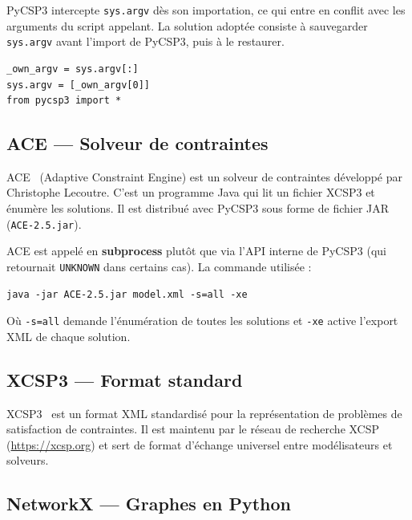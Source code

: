 \begin{attention}
  PyCSP3 intercepte \texttt{sys.argv} dès son importation, ce qui entre en conflit avec les
  arguments du script appelant. La solution adoptée consiste à sauvegarder \texttt{sys.argv}
  avant l'import de PyCSP3, puis à le restaurer.
  \begin{lstlisting}
_own_argv = sys.argv[:]
sys.argv = [_own_argv[0]]
from pycsp3 import *
  \end{lstlisting}
\end{attention}

\subsection{ACE — Solveur de contraintes}

\begin{definition}[ACE]
  ACE~\cite{ace} (Adaptive Constraint Engine) est un solveur de contraintes développé par
  Christophe Lecoutre. C'est un programme Java qui lit un fichier XCSP3 et énumère les
  solutions. Il est distribué avec PyCSP3 sous forme de fichier JAR
  (\texttt{ACE-2.5.jar}).
\end{definition}

ACE est appelé en \textbf{subprocess} plutôt que via l'API interne de PyCSP3 (qui retournait
\texttt{UNKNOWN} dans certains cas). La commande utilisée :

\begin{lstlisting}[style=benzai]
java -jar ACE-2.5.jar model.xml -s=all -xe
\end{lstlisting}

Où \texttt{-s=all} demande l'énumération de toutes les solutions et \texttt{-xe} active
l'export XML de chaque solution.

\subsection{XCSP3 — Format standard}

\begin{definition}[XCSP3]
  XCSP3~\cite{xcsp3} est un format XML standardisé pour la représentation de problèmes de
  satisfaction de contraintes. Il est maintenu par le réseau de recherche XCSP
  (\url{https://xcsp.org}) et sert de format d'échange universel entre modélisateurs et
  solveurs.
\end{definition}

\subsection{NetworkX — Graphes en Python}

